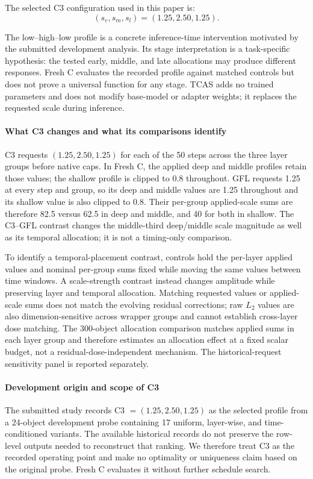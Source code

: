 \documentclass[times,twocolumn,final]{elsarticle}
\begin{document}
The selected C3 configuration used in this paper is:
\begin{equation}
(s_e, s_m, s_l) = (1.25, 2.50, 1.25).
\end{equation}

The low--high--low profile is a concrete inference-time intervention motivated by the submitted development analysis. Its stage interpretation is a task-specific hypothesis: the tested early, middle, and late allocations may produce different responses. Fresh C evaluates the recorded profile against matched controls but does not prove a universal function for any stage. TCAS adds no trained parameters and does not modify base-model or adapter weights; it replaces the requested scale during inference.

\paragraph{What C3 changes and what its comparisons identify}
C3 requests $(1.25,2.50,1.25)$ for each of the 50 steps across the three layer groups before native caps. In Fresh C, the applied deep and middle profiles retain those values; the shallow profile is clipped to 0.8 throughout. GFL requests 1.25 at every step and group, so its deep and middle values are 1.25 throughout and its shallow value is also clipped to 0.8. Their per-group applied-scale sums are therefore 82.5 versus 62.5 in deep and middle, and 40 for both in shallow. The C3--GFL contrast changes the middle-third deep/middle scale magnitude as well as its temporal allocation; it is not a timing-only comparison.

To identify a temporal-placement contrast, controls hold the per-layer applied values and nominal per-group sums fixed while moving the same values between time windows. A scale-strength contrast instead changes amplitude while preserving layer and temporal allocation. Matching requested values or applied-scale sums does not match the evolving residual corrections; raw $L_2$ values are also dimension-sensitive across wrapper groups and cannot establish cross-layer dose matching. The 300-object allocation comparison matches applied sums in each layer group and therefore estimates an allocation effect at a fixed scalar budget, not a residual-dose-independent mechanism. The historical-request sensitivity panel is reported separately.

\paragraph{Development origin and scope of C3}
The submitted study records C3 $=(1.25,2.50,1.25)$ as the selected profile from a 24-object development probe containing 17 uniform, layer-wise, and time-conditioned variants. The available historical records do not preserve the row-level outputs needed to reconstruct that ranking. We therefore treat C3 as the recorded operating point and make no optimality or uniqueness claim based on the original probe. Fresh C evaluates it without further schedule search.
\end{document}
